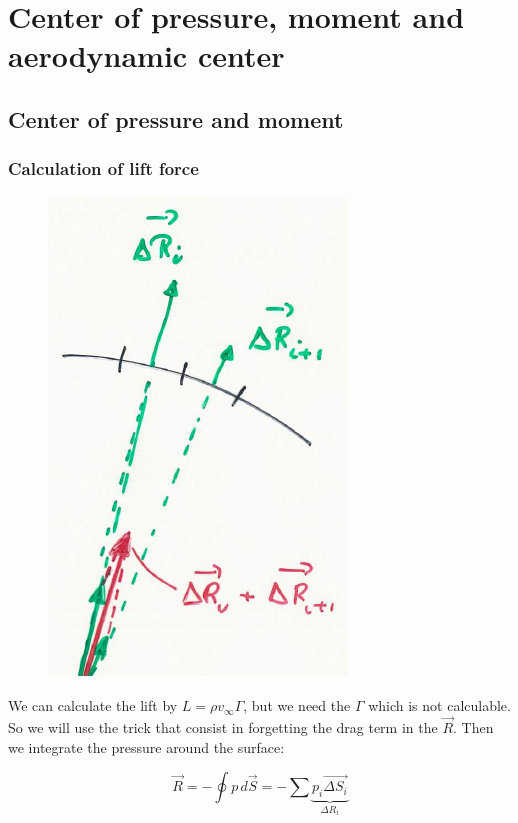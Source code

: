 		\section{Center of pressure, moment and aerodynamic center}
			\subsection{Center of pressure and moment}
				\subsubsection{Calculation of lift force}
					\begin{figure}
					\vspace{-5mm}
					\includegraphics[scale=0.4]{ch2/10}
					\end{figure}
					We can calculate the lift by $L = \rho v_\infty \Gamma$, but we need the $\Gamma$ which is not calculable. So we will use the trick that consist in forgetting the drag term in the $\vec{R}$. Then we integrate the pressure around the surface:
					
					\begin{equation}
					\vec{R} = -\oint p \, d\vec{S} = - \sum \underbrace{p_i \vec{\Delta S_i}}_{\Delta R_i}
					\end{equation}
					
